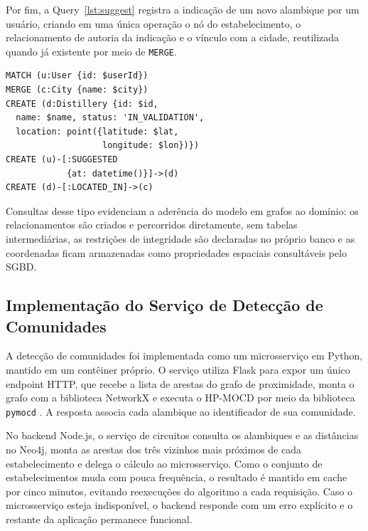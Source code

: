 \documentclass{jaes}
\begin{document}
Por fim, a Query~\ref{lst:suggest} registra a indicação de um novo alambique por um usuário, criando em uma única operação o nó do estabelecimento, o relacionamento de autoria da indicação e o vínculo com a cidade, reutilizada quando já existente por meio de \texttt{MERGE}.

\noindent\begin{minipage}{\columnwidth}
\begin{lstlisting}[caption={Indicação de um alambique: criação do nó e dos relacionamentos \texttt{SUGGESTED} e \texttt{LOCATED\_IN}.}, label={lst:suggest}]
MATCH (u:User {id: $userId})
MERGE (c:City {name: $city})
CREATE (d:Distillery {id: $id,
  name: $name, status: 'IN_VALIDATION',
  location: point({latitude: $lat,
                   longitude: $lon})})
CREATE (u)-[:SUGGESTED
            {at: datetime()}]->(d)
CREATE (d)-[:LOCATED_IN]->(c)
\end{lstlisting}
\end{minipage}

Consultas desse tipo evidenciam a aderência do modelo em grafos ao domínio: os relacionamentos são criados e percorridos diretamente, sem tabelas intermediárias, as restrições de integridade são declaradas no próprio banco e as coordenadas ficam armazenadas como propriedades espaciais consultáveis pelo SGBD.

\subsection{Implementação do Serviço de Detecção de Comunidades}
\label{sec:impl-comunidades}

A detecção de comunidades foi implementada como um microsserviço em Python, mantido em um contêiner próprio. O serviço utiliza Flask para expor um único endpoint HTTP, que recebe a lista de arestas do grafo de proximidade, monta o grafo com a biblioteca NetworkX e executa o HP-MOCD por meio da biblioteca \texttt{pymocd} \cite{Santos2025}. A resposta associa cada alambique ao identificador de sua comunidade.

No backend Node.js, o serviço de circuitos consulta os alambiques e as distâncias no Neo4j, monta as arestas dos três vizinhos mais próximos de cada estabelecimento e delega o cálculo ao microsserviço. Como o conjunto de estabelecimentos muda com pouca frequência, o resultado é mantido em cache por cinco minutos, evitando reexecuções do algoritmo a cada requisição. Caso o microsserviço esteja indisponível, o backend responde com um erro explícito e o restante da aplicação permanece funcional.
\end{document}
